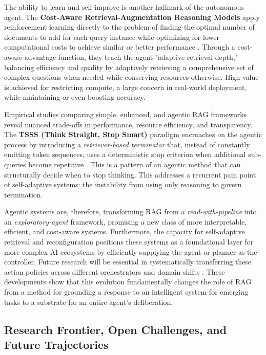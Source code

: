 \documentclass[11pt,a4paper]{article}
\begin{document}
The ability to learn and self-improve is another hallmark of the autonomous agent. The \textbf{Cost-Aware Retrieval-Augmentation Reasoning Models} apply reinforcement learning directly to the problem of finding the optimal number of documents to add for each query instance while optimizing for lower computational costs to achieve similar or better performance \cite{arxiv:2510.15719v1}. Through a cost-aware advantage function, they teach the agent "adaptive retrieval depth," balancing efficiency and quality by adaptively retrieving a comprehensive set of complex questions when needed while conserving resources otherwise. High value is achieved for restricting compute, a large concern in real-world deployment, while maintaining or even boosting accuracy.

Empirical studies comparing simple, enhanced, and agentic RAG frameworks reveal nuanced trade-offs in performance, resource efficiency, and transparency. The \textbf{TSSS (Think Straight, Stop Smart)} paradigm encroaches on the agentic process by introducing a \emph{retriever-based terminator} that, instead of constantly emitting token sequences, uses a deterministic stop criterion when additional sub-queries become repetitive \cite{arxiv:2510.19171v1}. This is a pattern of an agentic method that can structurally decide when to stop thinking. This addresses a recurrent pain point of self-adaptive systems: the instability from using only reasoning to govern termination.

Agentic systems are, therefore, transforming RAG from a \emph{read-with-pipeline} into an \emph{exploratory-agent} framework, promising a new class of more interpretable, efficient, and cost-aware systems. Furthermore, the capacity for self-adaptive retrieval and reconfiguration positions these systems as a foundational layer for more complex AI ecosystems by efficiently supplying the agent or planner as the controller. Future research will be essential in systematically transferring these action policies across different orchestrators and domain shifts \cite{arxiv:2502.01142v2}. These developments show that this evolution fundamentally changes the role of RAG from a method for grounding a response to an intelligent system for emerging tasks to a substrate for an entire agent's deliberation.


\subsection{Research Frontier, Open Challenges, and Future Trajectories}
\end{document}
